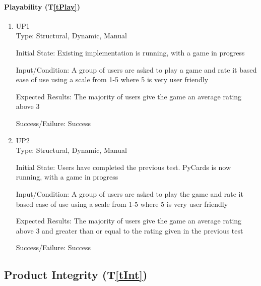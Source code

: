 \documentclass[12pt, titlepage]{article}
\newcommand{\tref}[1]{T\ref{#1}}
\begin{document}
	\paragraph{Playability (\tref{tPlay})}
	\begin{enumerate}
		\item{UP1\\}
		Type: Structural, Dynamic, Manual
		
		Initial State: Existing implementation is running, with a game in progress
		
		Input/Condition: A group of users are asked to play a game and rate it based
		ease of use using a scale from 1-5 where 5 is very user friendly
		
		Expected Results: The majority of users give the game an average rating above 3

		Success/Failure: Success

		\item{UP2\\}
		Type: Structural, Dynamic, Manual
		
		Initial State: Users have completed the previous test. PyCards is now running,
		with a game in progress
		
		Input/Condition: A group of users are asked to play the game and rate it based
		ease of use using a scale from 1-5 where 5 is very user friendly
		
		Expected Results: The majority of users give the game an average rating above 3
		and greater than or equal to the rating given in the previous test

		Success/Failure: Success
	\end{enumerate}

	\subsection{Product Integrity (\tref{tInt})}
\end{document}
